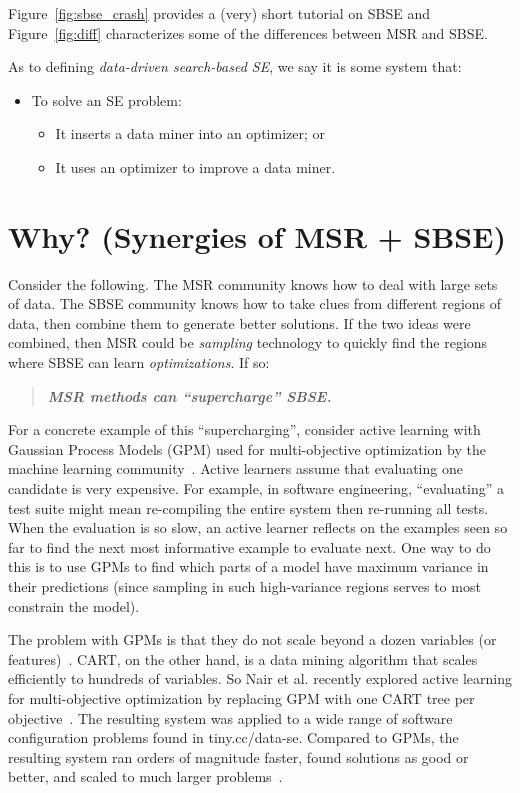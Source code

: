 \documentclass[sigconf]{acmart}
\begin{document}
 Figure~\ref{fig:sbse_crash} provides a (very) short tutorial on SBSE and  Figure~\ref{fig:diff} characterizes some of the differences between MSR 
and SBSE.
 
As to defining {\em data-driven search-based SE},
we say it is some system that:
\begin{itemize}[leftmargin=*]
\item To solve  an SE problem:
\begin{itemize}
\item
It inserts  a data miner into an optimizer; or
\item
It uses an optimizer  to improve a data  miner.
\end{itemize}
\end{itemize}





\section{  Why? (Synergies of MSR + SBSE)} \label{sec:why}

Consider the following. The MSR
community knows how to deal with large sets of data. The SBSE community knows how to take
clues from different regions of data, then combine them to generate better solutions.
If the two ideas were combined, then  MSR could be  {\em sampling} technology to quickly
find the regions where SBSE  can learn {\em  optimizations}. If so:
\begin{quote}
\centering
{\bf {\em   MSR  methods can ``supercharge''    SBSE.}}
\end{quote}
For a concrete example of this ``supercharging'', consider active learning
with Gaussian Process Models (GPM) used for multi-objective optimization
by the machine learning community~\cite{zuluaga2016varepsilon}.  Active learners assume that evaluating one candidate
is very expensive. For example, in software engineering, ``evaluating'' a test suite
might mean re-compiling the entire system then re-running all tests. When the evaluation is so slow,
an active learner reflects on the examples seen so far to find the next most informative
example to evaluate next. One way to do this is to use GPMs to
find which parts of a model have maximum variance in their predictions 
(since sampling
in such high-variance regions serves to most constrain the model).  

The problem with GPMs is that they do not scale beyond a dozen variables (or features)~\cite{wang2016bayesian}. CART, on the other hand, is a data mining algorithm that scales efficiently
to hundreds of variables. So Nair et al. recently explored active learning for multi-objective optimization by replacing GPM with one CART tree per objective~\cite{nair2018finding}.
 The resulting system was applied to a wide range of software configuration problems
 found in tiny.cc/data-se.
 Compared to GPMs, the resulting system ran orders of magnitude faster, found solutions as good or better, and scaled to much larger problems~\cite{nair2018finding}. 
\end{document}
